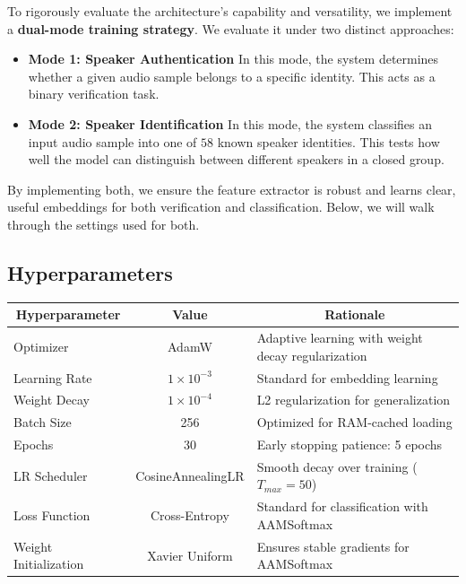 \documentclass[12pt,a4paper]{article}
\newcommand{\numSpeakers}{58}
\begin{document}
To rigorously evaluate the architecture's capability and versatility, we implement a \textbf{dual-mode training strategy}.
We evaluate it under two distinct approaches:

\begin{itemize}
    \item \textbf{Mode 1: Speaker Authentication}
    In this mode, the system determines whether a given audio sample belongs to a specific identity.
    This acts as a binary verification task.
    \item \textbf{Mode 2: Speaker Identification}
    In this mode, the system classifies an input audio sample into one of $\numSpeakers{}$ known speaker identities.
    This tests how well the model can distinguish between different speakers in a closed group.
\end{itemize}

By implementing both, we ensure the feature extractor is robust and learns clear, useful embeddings for both verification and classification.
Below, we will walk through the settings used for both.


\subsection{Hyperparameters}

\begin{table}[H]
\centering
\begin{tabular}{|l|c|l|}
\hline
\multicolumn{1}{|c|}{\textbf{Hyperparameter}} & 
\multicolumn{1}{c|}{\textbf{Value}} & 
\multicolumn{1}{c|}{\textbf{Rationale}} \\
\hline
Optimizer & AdamW & Adaptive learning with weight decay regularization \\
Learning Rate & $1 \times 10^{-3}$ & Standard for embedding learning \\
Weight Decay & $1 \times 10^{-4}$ & L2 regularization for generalization \\
Batch Size & 256 & Optimized for RAM-cached loading \\
Epochs & 30 & Early stopping patience: 5 epochs \\
LR Scheduler & CosineAnnealingLR & Smooth decay over training ($T_{max}=50$) \\
Loss Function & Cross-Entropy & Standard for classification with AAMSoftmax \\
Weight Initialization & Xavier Uniform & Ensures stable gradients for AAMSoftmax \\
\hline
\end{tabular}
\end{table}
\end{document}
